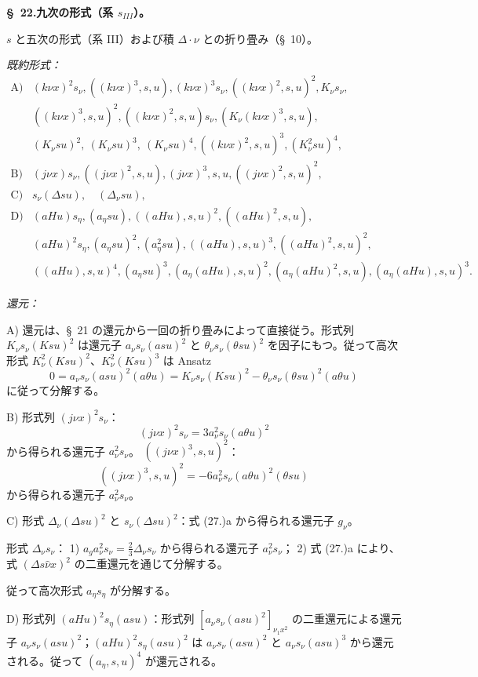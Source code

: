 \documentclass[11pt]{article}
\newcommand{\A}{\Delta}
\begin{document}
\begin{center}
\textbf{\S\ 22.\quad 九次の形式（系 $s_{III}$）。}
\end{center}

$s$ と五次の形式（系 III）および積 $\A\cdot\nu$ との折り畳み（\S\ 10）。

\noindent\emph{既約形式：}
\[
\begin{array}{ll}
\text{A)}& (k\nu x)^2s_\nu,
((k\nu x)^3,s,u),
(k\nu x)^3s_\nu,
((k\nu x)^2,s,u)^2,
K_\nu s_\nu,\\
& ((k\nu x)^3,s,u)^2,
((k\nu x)^2,s,u)s_\nu,
(K_\nu(k\nu x)^3,s,u),\\
& (K_\nu su)^2,\ (K_\nu su)^3,\ (K_\nu su)^4,
((k\nu x)^2,s,u)^3,
(K_\nu^2su)^4,\\[0.3em]
\text{B)}& (j\nu x)s_\nu,
((j\nu x)^2,s,u),
(j\nu x)^3,s,u,
((j\nu x)^2,s,u)^2,\\[0.3em]
\text{C)}& s_\nu(\A su),\quad (\A_\nu su),\\[0.3em]
\text{D)}& (aHu)s_\eta,
(a_\eta su),
((aHu),s,u)^2,
((aHu)^2,s,u),\\
& (aHu)^2s_\eta,
(a_\eta su)^2,
(a_\eta^2su),
((aHu),s,u)^3,
((aHu)^2,s,u)^2,\\
& ((aHu),s,u)^4,
(a_\eta su)^3,
(a_\eta(aHu),s,u)^2,
(a_\eta(aHu)^2,s,u),
(a_\eta(aHu),s,u)^3.
\end{array}
\]

\noindent\emph{還元：}

A) 還元は、\S\ 21 の還元から一回の折り畳みによって直接従う。形式列 $K_\nu s_\nu(Ksu)^2$ は還元子 $a_\nu s_\nu(asu)^2$ と $\theta_\nu s_\nu(\theta su)^2$ を因子にもつ。従って高次形式 $K_\nu^2(Ksu)^2$、$K_\nu^2(Ksu)^3$ は Ansatz
\[
0=a_\nu s_\nu(asu)^2(a\theta u)=K_\nu s_\nu(Ksu)^2-\theta_\nu s_\nu(\theta su)^2(a\theta u)
\]
に従って分解する。

B) 形式列 $(j\nu x)^2s_\nu$：
\[
(j\nu x)^2s_\nu=3a_\nu^2s_\nu(a\theta u)^2
\]
から得られる還元子 $a_\nu^2s_\nu$。
$((j\nu x)^3,s,u)^2$：
\[
((j\nu x)^3,s,u)^2=-6a_\nu^2s_\nu(a\theta u)^2(\theta su)
\]
から得られる還元子 $a_\nu^2s_\nu$。

C) 形式 $\A_\nu(\A su)^2$ と $s_\nu(\A su)^2$：式 (27.)a から得られる還元子 $g_\nu$。

形式 $\A_\nu s_\nu$：
1) $a_g a_\nu^2s_\nu=\frac23\A_\nu s_\nu$ から得られる還元子 $a_\nu^2s_\nu$；
2) 式 (27.)a により、式 $(\A s\widehat\nu x)^2$ の二重還元を通じて分解する。

従って高次形式 $a_\eta s_\eta$ が分解する。

D) 形式列 $(aHu)^2s_\eta(asu)$：形式列 $[a_\nu s_\nu(asu)^2]_{\nu_1x^2}$ の二重還元による還元子 $a_\nu s_\nu(asu)^2$；$(aHu)^2s_\eta(asu)^2$ は $a_\nu s_\nu(asu)^2$ と $a_\nu s_\nu(asu)^3$ から還元される。従って $(a_\eta,s,u)^4$ が還元される。
\end{document}
